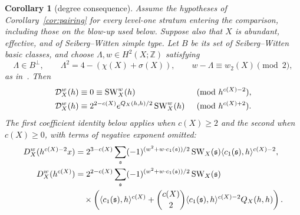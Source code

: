 \documentclass[11pt]{amsart}
\newtheorem{corollary}[theorem]{Corollary}
\theoremstyle{definition}
\theoremstyle{remark}
\theoremstyle{plain}
\newcommand{\cD}{\mathcal{D}}
\newcommand{\SW}{\operatorname{SW}}
\begin{document}
\begin{corollary}[degree consequence]\label{cor:degree}\label{cor:intro-degree}
Assume the hypotheses of Corollary~\ref{cor:pairing} for every level-one
stratum entering the comparison, including those on the blow-up used
below.  Suppose also that $X$ is abundant, effective, and of
Seiberg--Witten simple type.  Let $B$ be its set of Seiberg--Witten basic
classes, and choose $\Lambda,w\in H^2(X;\mathbb Z)$ satisfying
\begin{equation}\label{eq:degree-characteristic-data}
 \Lambda\in B^\perp,\qquad
 \Lambda^2=4-(\chi(X)+\sigma(X)),\qquad
 w-\Lambda\equiv w_2(X)\pmod2,
\end{equation}
as in~\cite[Theorem~1.1]{FeehanLenessLevelOne}.  Then
\begin{align}\label{eq:series-congruence}
 \cD_X^w(h)&\equiv0\equiv\SW_X^w(h)
 &&\pmod{h^{c(X)-2}},\notag\\
 \cD_X^w(h)&\equiv2^{2-c(X)}e^{Q_X(h,h)/2}\SW_X^w(h)
 &&\pmod{h^{c(X)+2}}.
\end{align}
The first coefficient identity below applies when $c(X)\geq2$ and
the second when $c(X)\geq0$, with terms of negative exponent omitted:
\begin{align}\label{eq:terminal-degrees}
 D_X^w(h^{c(X)-2}x)
 &=2^{3-c(X)}\sum_{\mathfrak s}
 (-1)^{(w^2+w\cdot c_1(\mathfrak s))/2}\SW_X(\mathfrak s)
 \langle c_1(\mathfrak s),h\rangle^{c(X)-2},\notag\\
 D_X^w(h^{c(X)})
 &=2^{2-c(X)}\sum_{\mathfrak s}
 (-1)^{(w^2+w\cdot c_1(\mathfrak s))/2}\SW_X(\mathfrak s)\notag\\
 &\quad\times\left(\langle c_1(\mathfrak s),h\rangle^{c(X)}
 +\binom{c(X)}2\langle c_1(\mathfrak s),h\rangle^{c(X)-2}
 Q_X(h,h)\right).
\end{align}
\end{corollary}
\end{document}
